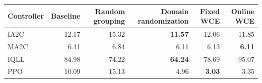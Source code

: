\begin{tabular}{lrrrrr}
\hline
Controller & Baseline & Random grouping & Domain randomization & Fixed WCE & Online WCE \\
\hline
IA2C & 12.17 & 15.32 & \textbf{11.57} & 12.06 & 11.85 \\
MA2C & 6.41 & 6.84 & 6.11 & 6.13 & \textbf{6.11} \\
IQLL & 84.98 & 74.22 & \textbf{64.24} & 78.69 & 95.07 \\
PPO & 10.09 & 15.13 & 4.96 & \textbf{3.03} & 3.35 \\
\hline
\end{tabular}
